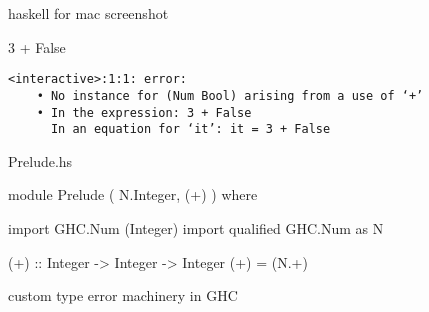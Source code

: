 
\begin{frame}

haskell for mac screenshot
\end{frame}


\begin{frame}[fragile]

\Large
\begin{texttt}
3 + False
\end{texttt}
\nl

\large
\begin{block}{}
\begin{Verbatim}
<interactive>:1:1: error:
    • No instance for (Num Bool) arising from a use of ‘+’
    • In the expression: 3 + False
      In an equation for ‘it’: it = 3 + False
\end{Verbatim}
\end{block}
\end{frame}


\begin{frame}[fragile]

\begin{block}{Prelude.hs}
\begin{haskellcode}
module Prelude
  ( N.Integer, (+)
  )
where

import GHC.Num (Integer)
import qualified GHC.Num as N

(+) :: Integer -> Integer -> Integer
(+) = (N.+)
\end{haskellcode}
\end{block}
\end{frame}



\begin{frame}

custom type error machinery in GHC

\end{frame}


